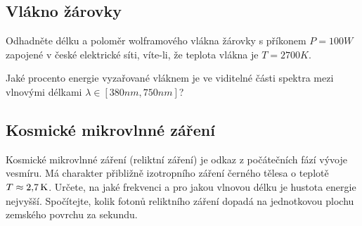 \subsection{Vlákno žárovky}
    Odhadněte délku a poloměr wolframového vlákna žárovky s příkonem $P=100\unit{W}$ zapojené v české elektrické síti, víte-li, že teplota vlákna je $T=2700\unit{K}$.

    Jaké procento energie vyzařované vláknem je ve viditelné části spektra mezi vlnovými délkami $\lambda\in[380\unit{nm},750\unit{nm}]$?

\subsection{Kosmické mikrovlnné záření}
    Kosmické mikrovlnné záření (reliktní záření) je odkaz z počátečních fází vývoje vesmíru.
    Má charakter přibližně izotropního záření černého tělesa o teplotě $T\approx2,\!7\,\mathrm{{K}}$.
    Určete, na jaké frekvenci a pro jakou vlnovou délku je hustota energie nejvyšší.
    Spočítejte, kolik fotonů reliktního záření dopadá na jednotkovou plochu zemského povrchu za sekundu.